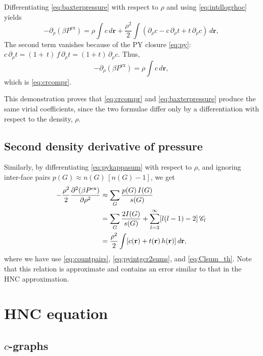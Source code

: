 \documentclass[aip,jcp,reprint,superscriptaddress]{revtex4-1}
\newcommand{\vct}[1]{\mathbf{#1}}
\providecommand{\vr}{} %
\renewcommand{\vr}{\vct{r}}
\newcommand{\supex}[1]{ { { #1 }^{ \mathrm{ex} } } }
\newcommand{\Pex}{\supex{P}}
\newcommand{\Chn}{\mathscr{C}}
\begin{document}
Differentiating \eqref{eq:baxterpressure}
with respect to $\rho$ and using \eqref{eq:intdlogrhoc} yields
%
\[
  -\partial_\rho ( \beta \Pex )
=
  \rho \int c \, d\vr
  + \frac{\rho^2}{2} \int (
    \partial_\rho c - c \, \partial_\rho t + t \, \partial_\rho c
    ) \, d\vr,
\]
The second term vanishes because of the PY closure \eqref{eq:py}:
$c \, \partial_\rho t = (1 + \, t) \, f \, \partial_\rho t = (1 + t) \, \partial_\rho c$.
%
Thus,
\[
  -\partial_\rho ( \beta \Pex )
=
  \rho \int c \, d\vr,
\]
which is \eqref{eq:crcompr}.

This demonstration proves that
\eqref{eq:crcompr} and \eqref{eq:baxterpressure}
produce the same virial coefficients,
since the two formulae differ only
by a differentiation with respect to the density, $\rho$.




\subsection{Second density derivative of pressure}

Similarly,
  by differentiating \eqref{eq:pykappasum} with respect to $\rho$,
  and ignoring inter-face pairs $p(G) \approx n(G) \, [n(G) - 1]$,
  we get
%
\begin{align}
           -\frac{\rho^2}{2}
            \frac{\partial^2 ( \beta \Pex ) }
                 {\partial \rho^2}
  &\approx   \sum_G \frac{ p(G) \, I(G) }{ s(G) }
    \notag \\
  &=
            \sum_G \frac{2 I(G) }{s(G)}
            + \sum_{l = 3}^\infty [l(l-1) - 2] \, \Chn_l
    \notag \\
  &=         \frac{\rho^2}{2} \int [c(\vr) + t(\vr) \, h(\vr) ] \, d\vr,
\label{eq:pyddpressure}
\end{align}
%
where we have use \eqref{eq:countpairs}, \eqref{eq:pyintgcr2sums}, and \eqref{eq:Clsum_th}.
%
Note that this relation is approximate
  and contains an error
  similar to that in the HNC approximation.





\section{\label{sec:hnc}HNC equation}


\subsection{$c$-graphs}
\end{document}
